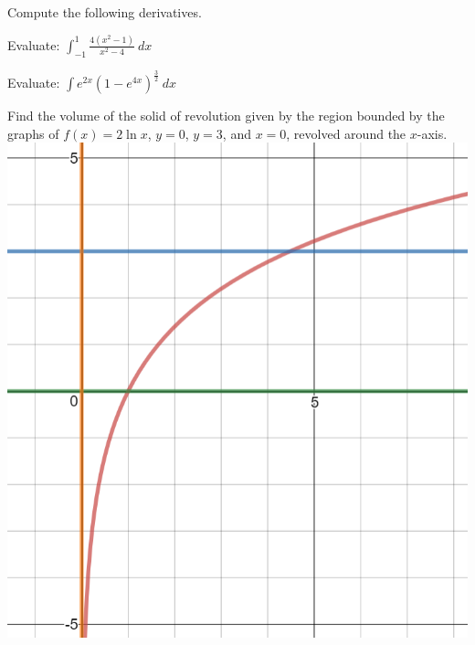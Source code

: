 \documentclass[12pt, addpoints]{exam/exam}
\newcommand{\1}{^{-1}}
\theoremstyle{plain}
\begin{document}
\begin{questions}
\thispagestyle{headandfoot}

\question Compute the following derivatives.

\newpage
\question[20] %
Evaluate: $\displaystyle \int_{-1}^1\frac{4(x^2-1)}{x^2-4}\ dx$ 

\newpage
\question[25] %
Evaluate: $\displaystyle \int e^{2x}(1-e^{4x})^{\frac{3}{2}}\ dx$

\newpage
\question[18] %
Find the volume of the solid of revolution given by the region bounded by the graphs of $f(x)=2\ln x$, $y=0$, $y=3$, and $x=0$, revolved around the $x$-axis.
\includegraphics[scale=0.4]{Calc2Exam16-2_58.png}


\end{questions}
\end{document}
